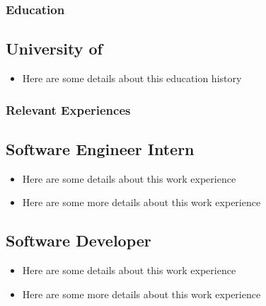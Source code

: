 \documentclass{mxresume}
\begin{document}
\vspace*{2mm}
\subsubsection*{\Large{Education}} %
\subsection*{University of } 
\begin{itemize}[leftmargin=5mm]
\setlength{\itemsep}{0mm}
\item Here are some details about this education history
\end{itemize}
\subsubsection*{\Large{Relevant Experiences}} %
\subsection*{Software Engineer Intern}
\begin{itemize}[leftmargin=5mm]
\setlength{\itemsep}{0mm}
\item Here are some details about this work experience
\item Here are some more details about this work experience
\end{itemize}
\subsection*{Software Developer}
\begin{itemize}[leftmargin=5mm]
\setlength{\itemsep}{0mm}
\item Here are some details about this work experience
\item Here are some more details about this work experience
\end{itemize}
\end{document}

